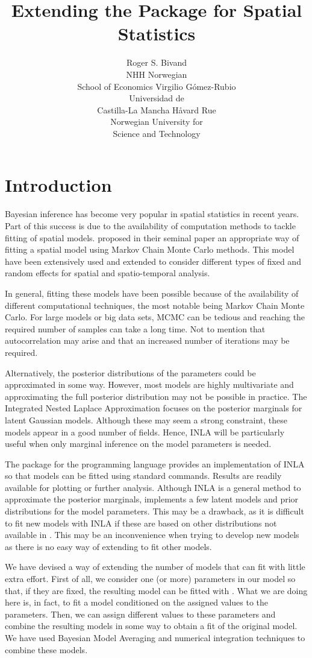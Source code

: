 \documentclass[article]{jss}
\author{Roger S. Bivand\\NHH Norwegian\\ School of Economics \And 
Virgilio G\'omez-Rubio\\Universidad de\\ Castilla-La Mancha 
\And H\r{a}vard Rue\\Norwegian University for\\ Science and Technology
}
\title{Extending the \pkg{R-INLA} Package for Spatial Statistics}
\begin{document}
\section[Introduction]{Introduction}


Bayesian inference has become very popular in spatial statistics in recent
years. Part of this success is due to the availability of computation methods
to tackle fitting of spatial models. \citet{besagetal:1991} proposed in their
seminal paper an appropriate way of fitting a spatial model using Markov Chain
Monte Carlo methods. This model have been extensively used and extended to
consider different types of fixed and random effects for spatial and
spatio-temporal analysis.

In general, fitting these models have been possible because of the availability
of different computational techniques, the most notable being Markov Chain
Monte Carlo. For large models or big data sets, MCMC can be tedious and
reaching the required number of samples can take a long time. Not to mention
that autocorrelation may arise and that an increased number of iterations may
be required.

Alternatively, the posterior distributions of the parameters could be
approximated in some way. However, most models are highly multivariate and
approximating the full posterior distribution may not be possible in practice.
The Integrated Nested Laplace Approximation \citep[][INLA]{isi:000264374200002} focuses on
the posterior marginals for latent Gaussian models. Although these may seem
a strong constraint, these models appear in a good number of fields. 
Hence, INLA will be particularly useful when  only
marginal inference on the model parameters is needed.

The  package \citep{rinla:2013} for the  programming language provides
an implementation of INLA so that models can be fitted using standard 
 commands. Results are readily available for plotting or
further analysis. Although INLA is a general method to approximate the
posterior marginals,  implements a few latent models and prior
distributions for the model parameters.
This may be a drawback, as it is difficult to fit new models with INLA if these
are based on other distributions not available in .  This may be an
inconvenience when trying to develop new models as there is no easy way of
extending  to fit other models.

We have devised a way of extending the number of models that  can
fit with little extra effort. First of all, we consider one (or more)
parameters in our model so that, if they are fixed, the resulting model can be
fitted with . What we are doing here is, in fact, to fit a model
conditioned on the assigned values to the parameters. Then, we can assign
different values to these parameters and combine the resulting models in some
way to obtain a fit of the original model. We have used Bayesian Model
Averaging and numerical integration techniques to combine these models.
\end{document}
